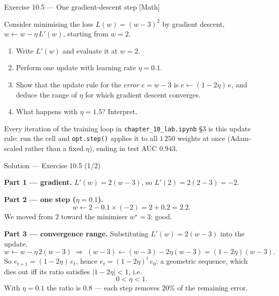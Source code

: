 \documentclass[aspectratio=169,11pt]{beamer}
\begin{document}
\begin{frame}{Exercise 10.5 --- One gradient-descent step [Math]}
\begin{exercise}
  Consider minimising the loss $L(w) = (w - 3)^2$ by gradient
  descent, $w \leftarrow w - \eta\, L'(w)$, starting from $w = 2$.
  \begin{enumerate}
    \item Write $L'(w)$ and evaluate it at $w = 2$.
    \item Perform one update with learning rate $\eta = 0.1$.
    \item Show that the update rule for the \emph{error} $e = w - 3$
          is $e \leftarrow (1 - 2\eta)\,e$, and deduce the range of
          $\eta$ for which gradient descent converges.
    \item What happens with $\eta = 1.5$? Interpret.
  \end{enumerate}
\end{exercise}
\begin{labnote}
  Every iteration of the training loop in \texttt{chapter\_10\_lab.ipynb} \S3 is this
  update rule: run the cell and \texttt{opt.step()} applies it to all $1\,250$ weights
  at once (Adam-scaled rather than a fixed $\eta$), ending in test AUC $0.943$.
\end{labnote}
\end{frame}

\begin{frame}{Solution --- Exercise 10.5 (1/2)}
\begin{solutionbox}
  \textbf{Part 1 --- gradient.}
  $L'(w) = 2(w - 3)$, so $L'(2) = 2(2 - 3) = -2$.

  \medskip
  \textbf{Part 2 --- one step ($\eta = 0.1$).}
  \[
    w \leftarrow 2 - 0.1 \times (-2) = 2 + 0.2 = 2.2 .
  \]
  We moved from $2$ toward the minimiser $w^\star = 3$: good.

  \medskip
  \textbf{Part 3 --- convergence range.} Substituting $L'(w) = 2(w-3)$
  into the update,
  \[
    w \leftarrow w - \eta\, 2(w - 3)
    \;\Longrightarrow\;
    (w - 3) \leftarrow (w - 3) - 2\eta (w - 3) = (1 - 2\eta)(w - 3).
  \]
  So $e_{t+1} = (1 - 2\eta)\, e_t$, hence $e_t = (1 - 2\eta)^t\, e_0$: a
  geometric sequence, which dies out iff its ratio satisfies
  $|1 - 2\eta| < 1$, i.e.
  \[
    0 < \eta < 1 .
  \]
  With $\eta = 0.1$ the ratio is $0.8$ --- each step removes $20\%$ of the
  remaining error.
\end{solutionbox}
\end{frame}
\end{document}
